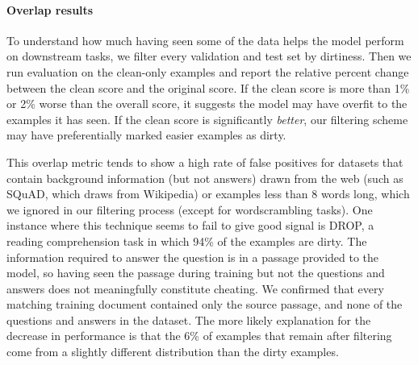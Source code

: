 \documentclass{article}
\begin{document}
\begin{table}
        \caption{Overlap statistics for all datasets sorted from dirtiest to cleanest. We consider a dataset example dirty if it has a single $N$-gram collision with any document in our training corpus. ``Relative Difference Clean vs All'' shows the percent change in performance between only the clean examples vs all the examples in the benchmark. ``Count'' shows the number of examples. ``Clean percentage'' is the percent of examples that are clean vs total. For ``Acc/F1/BLEU'' we use the metric specified in ``Metric''. These scores come from evaluations with a different seed for the random examples used for in-context learning, and will therefore differ slightly from the scores elsewhere in the paper. }
        \label{table:overlap_master}
    \end{table}

\paragraph{Overlap results} To understand how much having seen some of the data helps the model perform on downstream tasks, we filter every validation and test set by dirtiness. Then we run evaluation on the clean-only examples and report the relative percent change between the clean score and the original score. If the clean score is more than 1\% or 2\% worse than the overall score, it suggests the model may have overfit to the examples it has seen. If the clean score is significantly \emph{better}, our filtering scheme may have preferentially marked easier examples as dirty.

This overlap metric tends to show a high rate of false positives for datasets that contain background information (but not answers) drawn from the web (such as SQuAD, which draws from Wikipedia) or examples less than 8 words long, which we ignored in our filtering process (except for wordscrambling tasks). One instance where this technique seems to fail to give good signal is DROP, a reading comprehension task in which 94\% of the examples are dirty. The information required to answer the question is in a passage provided to the model, so having seen the passage during training but not the questions and answers does not meaningfully constitute cheating. We confirmed that every matching training document contained only the source passage, and none of the questions and answers in the dataset. The more likely explanation for the decrease in performance is that the 6\% of examples that remain after filtering come from a slightly different distribution than the dirty examples.
\end{document}
